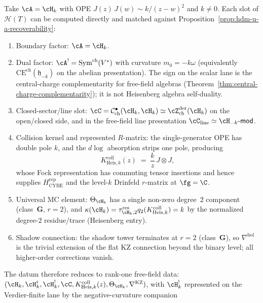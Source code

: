 \begin{remark}
\label{rem:hdm-heisenberg-verification}
Take $\cA = \cH_k$ with OPE $J(z)\,J(w) \sim k/(z-w)^2$ and
$k \neq 0$. Each slot of $\mathcal{H}(T)$ can be computed directly
and matched against
Proposition~\ref{prop:hdm-u-a-recoverability}:
\begin{enumerate}[label=\textup{(H\arabic*)}]
\item Boundary factor: $\cA = \cH_k$.
\item Dual factor:
 $\cA^! = \mathrm{Sym}^{\mathrm{ch}}(V^*)$ with curvature
 $m_0=-k\omega$ \textup{(}equivalently
 $\mathrm{CE}^{\mathrm{ch}}(\mathfrak h_{-k})$ on the abelian
 presentation\textup{)}.  The sign on the scalar lane is the
 central-charge complementarity for free-field algebras
 \textup{(}Theorem~\ref{thm:central-charge-complementarity}\textup{)};
 it is not Heisenberg algebra self-duality.
\item Closed-sector/line slot:
 $\cC = \mathcal{C}^{\bullet}_{\mathrm{ch}}(\cH_k,\cH_k)
 \simeq \cZ^{\mathrm{der}}_{\mathrm{ch}}(\cH_k)$ on the open/closed
 side, and in the free-field line presentation
 $\cC_{\mathrm{line}} \simeq \cH_{-k}\text{-}\mathsf{mod}$.
\item Collision kernel and represented $R$-matrix: the single-generator OPE has
 double pole $k$, and the $d\log$ absorption strips one
 pole, producing
 \[
 K^{\mathrm{coll}}_{\mathrm{Heis},k}(z)
 \;=\; \frac{k}{z}\, J \otimes J,
 \]
 whose Fock representation has commuting tensor insertions and hence
 supplies $H_{\mathrm{CYBE}}^{\mathrm{rep}}$ and the level-$k$
 Drinfeld $r$-matrix at $\fg=\C$.
\item Universal MC element: $\Theta_{\cH_k}$ has a single non-zero
 degree~$2$ component (class~$\mathbf{G}$, $r = 2$), and
 $\kappa(\cH_k)=\tau_{\cH_k,2}^{\mathrm{res}}
 q_2(K^{\mathrm{coll}}_{\mathrm{Heis},k})=k$ by the normalized
 degree-$2$ residue/trace
 (Heisenberg entry).
\item Shadow connection: the shadow tower terminates at $r = 2$
 (class~$\mathbf{G}$), so $\nabla^{\mathrm{hol}}$ is the trivial
 extension of the flat KZ connection beyond the binary level; all
 higher-order corrections vanish.
\end{enumerate}
The datum therefore reduces to rank-one free-field data:
$(\cH_k,\cH_k^i,\cH_k^!,\cC,K^{\mathrm{coll}}_{\mathrm{Heis},k}(z),
\Theta_{\cH_k},\nabla^{\mathrm{KZ}})$, with $\cH_k^!$ represented on
the Verdier-finite lane by the negative-curvature companion

\end{remark}
